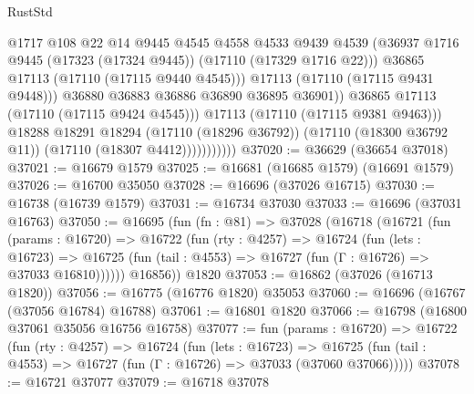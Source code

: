 \begin{lexlean}{RustStd}
\begin{coremodule}
                                  @1717
                                  @108
                                  @22
                                  @14
                                  @9445
                                  @4545
                                  @4558
                                  @4533
                                  @9439
                                  @4539
                                  (@36937
                                    @1716
                                    @9445
                                    (@17323 (@17324 @9445))
                                    (@17110 (@17329 @1716 @22)))
                                  @36865
                                  @17113
                                  (@17110 (@17115 @9440 @4545)))
                                @17113
                                (@17110 (@17115 @9431 @9448)))
                              @36880
                              @36883
                              @36886
                              @36890
                              @36895
                              @36901))
                          @36865
                          @17113
                          (@17110 (@17115 @9424 @4545)))
                        @17113
                        (@17110 (@17115 @9381 @9463)))
                      @18288
                      @18291
                      @18294
                      (@17110 (@18296 @36792))
                      (@17110 (@18300 @36792 @11))
                      (@17110 (@18307 @4412)))))))))))
@37020 := @36629 (@36654 @37018)
@37021 := @16679 @1579
@37025 := @16681 (@16685 @1579) (@16691 @1579)
@37026 := @16700 @35050
@37028 := @16696 (@37026 @16715)
@37030 := @16738 (@16739 @1579)
@37031 := @16734 @37030
@37033 := @16696 (@37031 @16763)
@37050 := @16695
    (fun (fn : @81) =>
    @37028
      (@16718
        (@16721
          (fun (params : @16720) =>
          @16722
            (fun (rty : @4257) =>
            @16724
              (fun (lets : @16723) =>
              @16725 (fun (tail : @4553) => @16727 (fun (Γ : @16726) => @37033 @16810))))))
        @16856))
    @1820
@37053 := @16862 (@37026 (@16713 @1820))
@37056 := @16775 (@16776 @1820) @35053
@37060 := @16696 (@16767 (@37056 @16784) @16788)
@37061 := @16801 @1820
@37066 := @16798 (@16800 @37061 @35056 @16756 @16758)
@37077 := fun (params : @16720) =>
  @16722
    (fun (rty : @4257) =>
    @16724
      (fun (lets : @16723) =>
      @16725 (fun (tail : @4553) => @16727 (fun (Γ : @16726) => @37033 (@37060 @37066)))))
@37078 := @16721 @37077
@37079 := @16718 @37078

\end{coremodule}
\end{lexlean}
